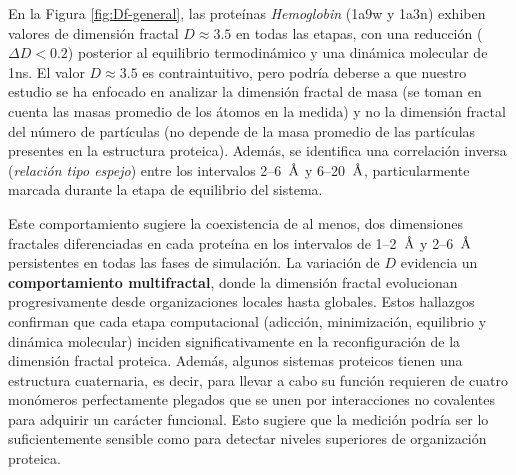 	
	
	
	En la Figura \ref{fig:Df-general}, las prote\'{i}nas \textit{Hemoglobin} (1a9w y 1a3n) exhiben valores de dimensi\'{o}n fractal $D \approx 3.5$ en todas las etapas, con una reducci\'{o}n  ($\Delta D < 0.2$) posterior al equilibrio termodin\'{a}mico y una din\'{a}mica molecular de 1ns. El valor $D \approx 3.5$  es contraintuitivo, pero podr\'{i}a deberse a que nuestro estudio se ha enfocado en analizar la dimensi\'{o}n fractal de masa (se toman en cuenta las masas promedio de los \'{a}tomos en la medida) y no la dimensi\'{o}n fractal del número de part\'{i}culas (no depende de la masa promedio de las part\'{i}culas presentes en la estructura proteica). Adem\'{a}s, se identifica una correlaci\'{o}n inversa (\emph{relaci\'{o}n tipo espejo}) entre los intervalos 2--6~$\textup{\r{A}}$ y 6--20~$\textup{\r{A}}$, particularmente marcada durante la etapa de equilibrio del sistema.
	
	Este comportamiento sugiere la coexistencia de al menos, dos dimensiones fractales diferenciadas en cada prote\'{i}na en los intervalos de 1--2~$\textup{\r{A}}$ y 2--6~$\textup{\r{A}}$ persistentes en todas las fases de simulaci\'{o}n. La variaci\'{o}n de $D$ evidencia un \textbf{comportamiento multifractal}, donde la dimensi\'{o}n fractal evolucionan progresivamente desde organizaciones locales hasta globales. Estos hallazgos confirman que cada etapa computacional (adicci\'{o}n, minimizaci\'{o}n, equilibrio y din\'{a}mica molecular) inciden significativamente en la reconfiguraci\'{o}n de la dimensi\'{o}n fractal proteica. Adem\'{a}s, algunos sistemas proteicos tienen una estructura cuaternaria, es decir, para llevar a cabo su función requieren de cuatro mon\'{o}meros perfectamente plegados que se unen por interacciones no covalentes para adquirir un car\'{a}cter funcional. Esto sugiere que la medición podría ser lo suficientemente sensible como para detectar niveles superiores de organización proteica.
	
